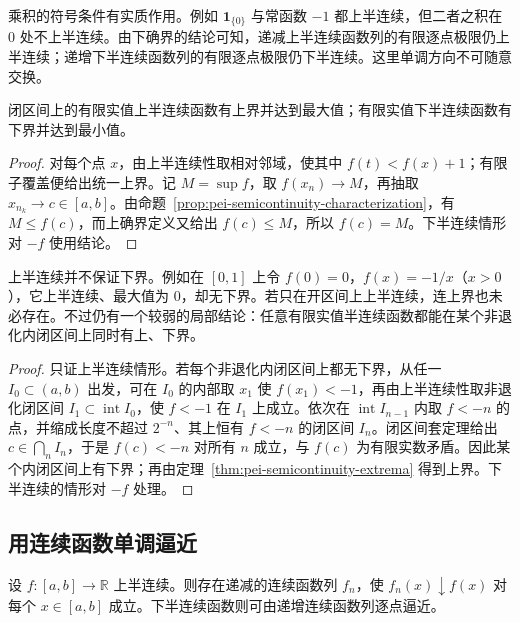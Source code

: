 乘积的符号条件有实质作用。例如 $\boldsymbol{1}_{\{0\}}$ 与常函数 $-1$ 都上半连续，但二者之积在 $0$ 处不上半连续。由下确界的结论可知，递减上半连续函数列的有限逐点极限仍上半连续；递增下半连续函数列的有限逐点极限仍下半连续。这里单调方向不可随意交换。

\begin{theorem}
\label{thm:pei-semicontinuity-extrema}
闭区间上的有限实值上半连续函数有上界并达到最大值；有限实值下半连续函数有下界并达到最小值。
\end{theorem}

\begin{proof}
对每个点 $x$，由上半连续性取相对邻域，使其中 $f(t)<f(x)+1$；有限子覆盖便给出统一上界。记 $M=\sup f$，取 $f(x_n)\to M$，再抽取 $x_{n_k}\to c\in[a,b]$。由命题~\ref{prop:pei-semicontinuity-characterization}，有 $M\le f(c)$，而上确界定义又给出 $f(c)\le M$，所以 $f(c)=M$。下半连续情形对 $-f$ 使用结论。
\end{proof}

上半连续并不保证下界。例如在 $[0,1]$ 上令 $f(0)=0$，$f(x)=-1/x$（$x>0$），它上半连续、最大值为 $0$，却无下界。若只在开区间上上半连续，连上界也未必存在。不过仍有一个较弱的局部结论：任意有限实值半连续函数都能在某个非退化内闭区间上同时有上、下界。

\begin{proof}
只证上半连续情形。若每个非退化内闭区间上都无下界，从任一 $I_0\subset(a,b)$ 出发，可在 $I_0$ 的内部取 $x_1$ 使 $f(x_1)<-1$，再由上半连续性取非退化闭区间 $I_1\subset\operatorname{int}I_0$，使 $f<-1$ 在 $I_1$ 上成立。依次在 $\operatorname{int}I_{n-1}$ 内取 $f<-n$ 的点，并缩成长度不超过 $2^{-n}$、其上恒有 $f<-n$ 的闭区间 $I_n$。闭区间套定理给出 $c\in\bigcap_nI_n$，于是 $f(c)<-n$ 对所有 $n$ 成立，与 $f(c)$ 为有限实数矛盾。因此某个内闭区间上有下界；再由定理~\ref{thm:pei-semicontinuity-extrema} 得到上界。下半连续的情形对 $-f$ 处理。
\end{proof}

\subsection{用连续函数单调逼近}

\begin{theorem}
\label{thm:pei-semicontinuity-approximation}
设 $f:[a,b]\to\mathbb R$ 上半连续。则存在递减的连续函数列 $f_n$，使 $f_n(x)\downarrow f(x)$ 对每个 $x\in[a,b]$ 成立。下半连续函数则可由递增连续函数列逐点逼近。
\end{theorem}

